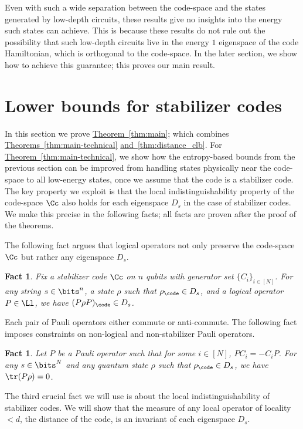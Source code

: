 \documentclass[11pt]{article}
\newcommand{\expref}[2]{\texorpdfstring{\hyperref[#2]{#1~\ref{#2}}}{#1~\ref{#2}}}
\newtheorem{fact}[theorem]{Fact}
\begin{document}
Even with such a wide separation between the code-space and the states generated by low-depth circuits,
%
these results give no insights into the energy such states can achieve. This is because these results do not rule out the possibility that such low-depth circuits
%
live in the energy $1$ eigenspace of the code Hamiltonian, which is orthogonal to the code-space. In the later section, we show how to achieve this guarantee; this proves our main result.


\section{Lower bounds for stabilizer codes}
\label{sec:main}

In this section we prove \expref{Theorem}{thm:main}; {which combines \expref{Theorems}{thm:main-technical} \expref{and}{thm:distance_clb}. For \expref{Theorem}{thm:main-technical}}, we show how the entropy-based bounds from the previous section can be improved from handling states physically near the code-space to all low-energy states, once we assume that the code is a stabilizer code. The key property we exploit is that the local indistinguishability property of the code-space $\Cc$ also holds for each eigenspace $D_s$ in the case of stabilizer codes. We make this precise in the following facts; all facts are proven after the proof of the theorems.

The following fact argues that logical operators not only preserve the code-space $\Cc$ but rather any eigenspace $D_s$.

\begin{fact}
\label{fact:logact}
Fix a stabilizer code $\Cc$ on $n$ qubits with generator set $\{C_i\}_{i \in [N]}$. For any string $s \in \bits^{n}$, a state $\rho$ such that $\rho_\code \in D_s$, and a logical operator $P \in \Ll$, we have $(P\rho P)_{\code} \in D_s$.
\end{fact}

Each pair of Pauli operators either commute or anti-commute. The following fact imposes constraints on non-logical and non-stabilizer Pauli operators.

\begin{fact}
\label{fact:zeroexp}
Let $P$ be a Pauli operator such that for some $i \in [N]$, $P C_i = - C_i P$. For any $s \in \bits^{N}$ and any quantum state $\rho$ such that $\rho_\code \in D_s$, we have $\tr(P \rho) = 0$.
\end{fact}

The third crucial fact we will use is about the local indistinguishability of stabilizer codes. We will show that the measure of any local operator of locality $< d$, the distance of the code, is an invariant of each eigenspace $D_s$.
\end{document}
